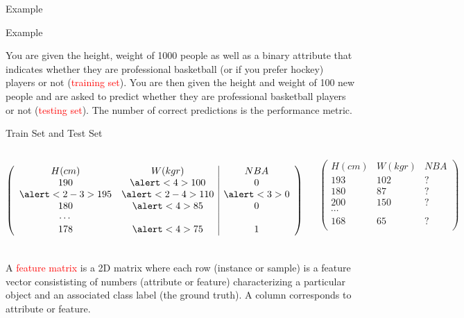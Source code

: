 \documentclass[12pt]{beamer}
\begin{document}
\begin{frame}{Example} 
\begin{block}{Example} 

You are given the height, weight of 1000 people as well as a binary
attribute that indicates whether they are professional basketball (or
if you prefer hockey) players or not (\textcolor{red}{training
  set}). You are then given the height and weight of 100 new people
and are asked to predict whether they are professional basketball
players or not (\textcolor{red}{testing set}). The number of correct
predictions is the performance metric.
\end{block}
\end{frame}



\begin{frame}{Train Set and Test Set}

\vspace{-1cm} 
\begin{columns}[t]
\[
\left( 
\begin{array}{cc|c}
H (cm) & W (kgr) & NBA  \\
190 & \alert<4>{100} & 0 \\ 
\alert<2-3> {195} & \alert<2-4>{110} & \alert<3>{0} \\ 
180 & \alert<4>{85}  & 0 \\ 
\cdots & \\ 
178 & \alert<4>{75}  & 1 \\ 
\end{array}
\right)
\]


\[
\left( 
\begin{array}{cc|c}
H(cm) & W(kgr) & NBA \\ 
193 & 102 & ? \\ 
180 & 87  & ? \\ 
200 & 150  & ? \\ 
\cdots & \\ 
168 & 65  & ? \\ 
\end{array}
\right)
\]

\end{columns}

\begin{definition}
A \textcolor{red}{feature matrix} is a 2D matrix \pause where each
row (\alert<2->{instance or sample}) is a feature vector
consististing of numbers (\alert<2->{attribute or feature})
characterizing a particular object \pause and an associated \alert<3->{class
label} (the ground truth). \pause A column corresponds to \alert<4>{attribute} or feature.
\end{definition} 
\end{frame}
\end{document}
